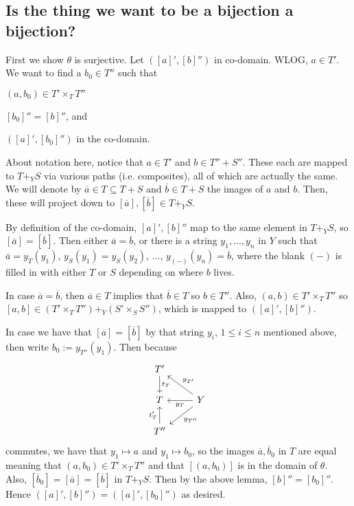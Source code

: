 \documentclass[12pt]{article}
\renewcommand{\(}{\left(}
\renewcommand{\)}{\right)}
\renewcommand{\{}{\left\lbrace}
\renewcommand{\}}{\right\rbrace}
\renewcommand{\bar}{\overline}
\theoremstyle{remark}
\theoremstyle{definition}
\begin{document}
\subsection*{Is the thing we want to be a bijection a bijection?}

First we show $\theta$ is surjective.  Let $([a]',[b]'')$ in co-domain.  WLOG, $a \in T'$.  We want to find a $b_0 \in T''$ such that 
\begin{itemize*}
	\item $(a,b_0) \in T' \times_T T''$
	\item $[b_0]''=[b]''$, and
	\item $([a]',[b_0]'')$ in the co-domain.
\end{itemize*}
About notation here, notice that $a \in T'$ and $b \in T'' + S''$.  These each are mapped to $T+_YS$ via various paths (i.e. composites), all of which are actually the same.  We will denote by $\bar{a} \in T \subseteq T+S$ and $\bar{b} \in T+S$ the images of $a$ and $b$. Then, these will project down to $[\bar{a}],[\bar{b}]  \in T+_YS$.  

By definition of the co-domain, $[a]',[b]''$ map to the same element in $T +_YS$, so $[\bar{a}]=[\bar{b}]$. Then either $\bar{a}=\bar{b}$, or there is a string $y_1,\dotsc, y_n$ in $Y$ such that $\bar{a}=y_T(y_1)$, $y_S(y_1)=y_S(y_2)$, $\dotsc$, $y_{(-)}(y_n)=\bar{b}$, where the blank $(-)$ is filled in with either $T$ or $S$ depending on where $b$ lives.  

In case $\bar{a}=\bar{b}$, then $\bar{a} \in T$ implies that $\bar{b} \in T$ so $b \in T''$.  Also, $(a,b) \in T' \times_T T''$ so $[a,b] \in (T' \times_T T'') +_Y (S' \times_S S'')$, which is mapped to $([a]',[b]'')$. 

In case we have that $[\bar{a}]=[\bar{b}]$ by that string $y_i$, $1\leq i \leq n$ mentioned above, then write $b_0 := y_{T''}(y_1)$. Then because
\[
	\begin{tikzcd}
		{T'} 
			\arrow[d,"t_T"] &
		{} \\
		{T} &
		{Y} 
			\arrow[ul,swap,"y_{T'}"] 
			\arrow[l,"y_T"]
			\arrow[dl,"y_{T''}"] \\
		{T''} 
			\arrow[u,"t'_T"] &
		{} 
	\end{tikzcd}
\]
commutes, we have that $y_1 \mapsto a$ and $y_1 \mapsto b_0$, so the images $\bar{a},\bar{b}_0$ in $T$ are equal meaning that $(a,b_0) \in T' \times_T T''$ and that $[(a,b_0)]$ is in the domain of $\theta$.  Also, $[\bar{b}_0] = [\bar{a}] = [\bar{b}]$ in $T+_YS$.  Then by the above lemma, $[b]''=[b_0]''$.  Hence $([a]',[b]'')=([a]',[b_0]'')$ as desired.  
\end{document}
